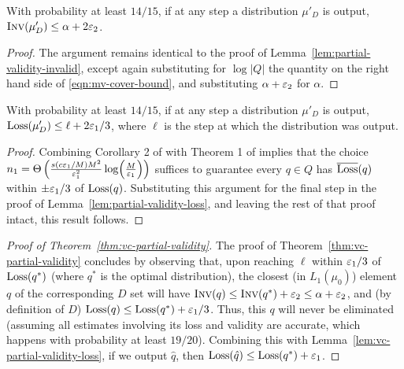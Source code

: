 \begin{lemma}
\label{lem:vc-partial-validity-invalid}
With probability at least $14/15$, if at any step a distribution $\mu'_D$ is output, $\textsc{Inv}(\mu'_D) \le \alpha + 2\varepsilon_2$.
\end{lemma}
\begin{proof}
The argument remains identical to the proof of Lemma~\ref{lem:partial-validity-invalid}, 
except again substituting for $\log|Q|$ the quantity on the right hand side of \eqref{eqn:mv-cover-bound}, 
and substituting $\alpha+\varepsilon_{2}$ for $\alpha$.
\end{proof}

\begin{lemma}
\label{lem:vc-partial-validity-loss}
With probability at least $14/15$, if at any step a distribution $\mu'_D$ is output, $\text{Loss}(\mu'_D) \le \ell + 2\varepsilon_1/3$, where $\ell$ is the step at which the distribution was output.
\end{lemma}
\begin{proof}
Combining Corollary 2 of \cite{Haussler92} with Theorem 1 of \cite{MendelsonV03} implies that 
the choice $n_{1} = \Theta\left(\frac{s(c\varepsilon_{1}/M) M^{2}}{\varepsilon_1^2} \log \!\left(\frac{M}{\varepsilon_{1}}\right)  \right)$ 
suffices to guarantee every $q \in Q$ has $\overline{\text{Loss}}(q)$ within $\pm \varepsilon_{1}/3$ of $\text{Loss}(q)$.
Substituting this argument for the final step in the proof of Lemma~\ref{lem:partial-validity-loss}, 
and leaving the rest of that proof intact, this result follows.
\end{proof}

\begin{proof}[Proof of Theorem~\ref{thm:vc-partial-validity}]
The proof of Theorem~\ref{thm:vc-partial-validity} concludes by observing that, upon reaching $\ell$ within $\varepsilon_{1}/3$ of $\text{Loss}(q^*)$ (where $q^{*}$ is the optimal distribution), 
the closest (in $L_{1}(\mu_{0})$) element $q$ of the corresponding $D$ set will have $\textsc{Inv}(q) \leq \textsc{Inv}(q^{*})+\varepsilon_{2} \leq \alpha+\varepsilon_{2}$, and (by definition of $D$) $\text{Loss}(q) \leq \text{Loss}(q^{*})+\varepsilon_{1}/3$.
Thus, this $q$ will never be eliminated (assuming all estimates involving its loss and validity are accurate, 
which happens with probability at least $19/20$). %
Combining this with Lemma~\ref{lem:vc-partial-validity-loss}, if we output $\hat q$, then $\text{Loss}(\hat q) \leq \text{Loss}(q^*) + \varepsilon_1$.
\end{proof}
